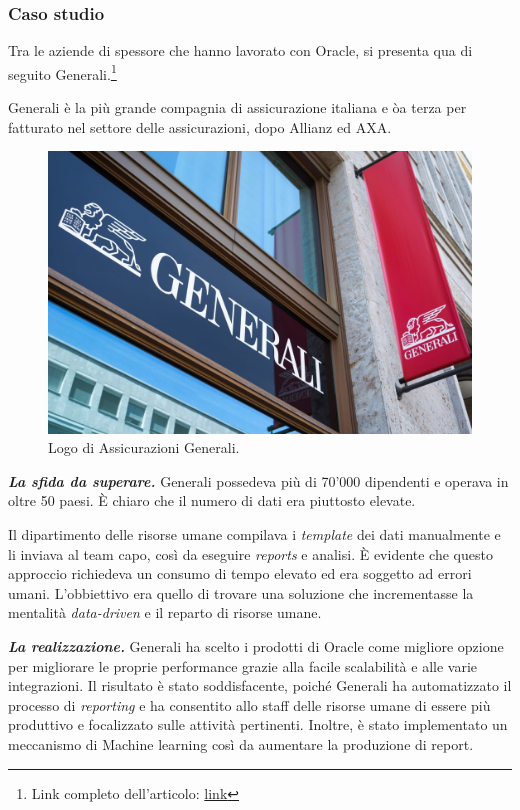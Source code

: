 \documentclass[a4paper]{article}
\begin{document}
	\subsubsection{Caso studio}
	
	Tra le aziende di spessore che hanno lavorato con Oracle, si presenta qua di seguito Generali.\footnote{Link completo dell'articolo: \href{https://www.oracle.com/customers/generali/}{link}}\newline
	
	\noindent
	Generali è la più grande compagnia di assicurazione italiana e òa terza per fatturato nel settore delle assicurazioni, dopo Allianz ed AXA.
	\begin{figure}[!htp]
		\centering
		\includegraphics[width=\textwidth]{img/Generali-1.jpg}
		\caption{Logo di Assicurazioni Generali.}
	\end{figure}
	
	\noindent
	\textbf{\emph{La sfida da superare.}} Generali possedeva più di 70'000 dipendenti e operava in oltre 50 paesi. È chiaro che il numero di dati era piuttosto elevate.
	
	Il dipartimento delle risorse umane compilava i \emph{template} dei dati manualmente e li inviava al team capo, così da eseguire \emph{reports} e analisi. È evidente che questo approccio richiedeva un consumo di tempo elevato ed era soggetto ad errori umani. L'obbiettivo era quello di trovare una soluzione che incrementasse la mentalità \emph{data-driven} e il reparto di risorse umane.\newline
	
	\noindent
	\textbf{\emph{La realizzazione.}} Generali ha scelto i prodotti di Oracle come migliore opzione per migliorare le proprie performance grazie alla facile scalabilità e alle varie integrazioni. Il risultato è stato soddisfacente, poiché Generali ha automatizzato il processo di \emph{reporting} e ha consentito allo staff delle risorse umane di essere più produttivo e focalizzato sulle attività pertinenti. Inoltre, è stato implementato un meccanismo di Machine learning così da aumentare la produzione di report.\newpage
	
\end{document}
